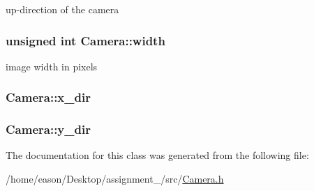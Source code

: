 up-\/direction of the camera 

\subsubsection[{\texorpdfstring{width}{width}}]{\setlength{\rightskip}{0pt plus 5cm}unsigned int Camera\+::width}\hypertarget{classCamera_aa18f0bf8b6e8cb661643d980a4484ac0}{}\label{classCamera_aa18f0bf8b6e8cb661643d980a4484ac0}


image width in pixels 

\subsubsection[{\texorpdfstring{x\+\_\+dir}{x_dir}}]{ Camera\+::x\+\_\+dir\hspace{0.3cm}{\ttfamily [private]}}\hypertarget{classCamera_aa7766618e7cc508ff0a825559e014d31}{}\label{classCamera_aa7766618e7cc508ff0a825559e014d31}
\subsubsection[{\texorpdfstring{y\+\_\+dir}{y_dir}}]{ Camera\+::y\+\_\+dir\hspace{0.3cm}{\ttfamily [private]}}\hypertarget{classCamera_a55166ac03aba3b694e9ef2df29be58f0}{}\label{classCamera_a55166ac03aba3b694e9ef2df29be58f0}


The documentation for this class was generated from the following file\+:\begin{DoxyCompactItemize}
\item 
/home/eason/\+Desktop/assignment\+\_/src/\hyperlink{Camera_8h}{Camera.\+h}\end{DoxyCompactItemize}
